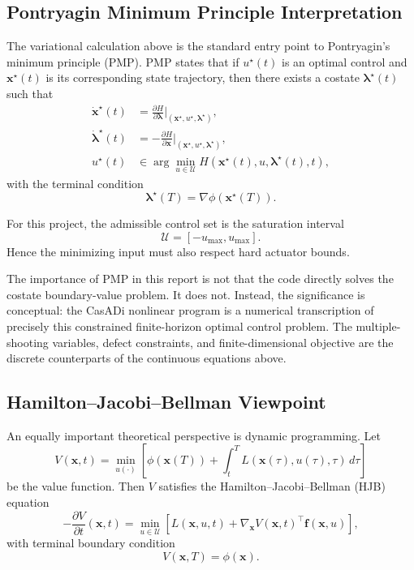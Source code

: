 \documentclass[conference]{IEEEtran}
\begin{document}
\subsection{Pontryagin Minimum Principle Interpretation}
The variational calculation above is the standard entry point to Pontryagin's minimum principle (PMP). PMP states that if $u^{\star}(t)$ is an optimal control and $\bm{x}^{\star}(t)$ is its corresponding state trajectory, then there exists a costate $\bm{\lambda}^{\star}(t)$ such that
\begin{align}
\dot{\bm{x}}^{\star}(t) &= \frac{\partial H}{\partial \bm{\lambda}}
\Big|_{(\bm{x}^{\star},u^{\star},\bm{\lambda}^{\star})},
\\
\dot{\bm{\lambda}}^{\star}(t) &= -\frac{\partial H}{\partial \bm{x}}
\Big|_{(\bm{x}^{\star},u^{\star},\bm{\lambda}^{\star})},
\\
u^{\star}(t) &\in \arg\min_{u\in\mathcal{U}}
H(\bm{x}^{\star}(t),u,\bm{\lambda}^{\star}(t),t),
\end{align}
with the terminal condition
\begin{equation}
\bm{\lambda}^{\star}(T)=\nabla \phi(\bm{x}^{\star}(T)).
\end{equation}

For this project, the admissible control set is the saturation interval
\begin{equation}
\mathcal{U} = [-u_{\max},u_{\max}].
\end{equation}
Hence the minimizing input must also respect hard actuator bounds.

The importance of PMP in this report is not that the code directly solves the costate boundary-value problem. It does not. Instead, the significance is conceptual: the CasADi nonlinear program is a numerical transcription of precisely this constrained finite-horizon optimal control problem. The multiple-shooting variables, defect constraints, and finite-dimensional objective are the discrete counterparts of the continuous equations above.

\subsection{Hamilton--Jacobi--Bellman Viewpoint}
An equally important theoretical perspective is dynamic programming. Let
\begin{equation}
V(\bm{x},t)=
\min_{u(\cdot)}
\left[
\phi(\bm{x}(T))
+
\int_t^T L(\bm{x}(\tau),u(\tau),\tau)\,d\tau
\right]
\end{equation}
be the value function. Then $V$ satisfies the Hamilton--Jacobi--Bellman (HJB) equation
\begin{equation}
-\frac{\partial V}{\partial t}(\bm{x},t)
=
\min_{u\in\mathcal{U}}
\left[
L(\bm{x},u,t)
+
\nabla_{\bm{x}}V(\bm{x},t)^{\top}\bm{f}(\bm{x},u)
\right],
\label{eq:hjb}
\end{equation}
with terminal boundary condition
\begin{equation}
V(\bm{x},T)=\phi(\bm{x}).
\end{equation}
\end{document}
